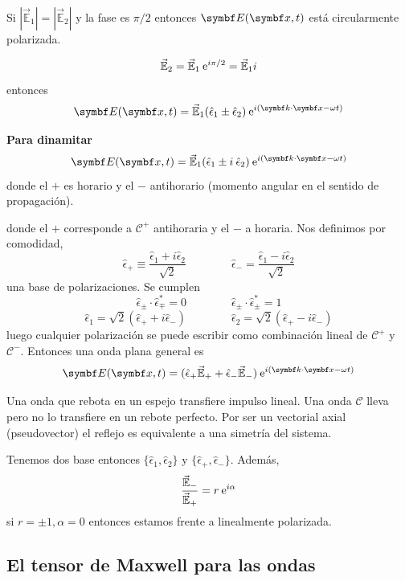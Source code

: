 \documentclass[10pt,oneside]{CBFT_book}
\begin{document}
Si $|\vec{\mathbb{E}}_1|=|\vec{\mathbb{E}}_2|$ y la fase es $\pi/2$ entonces $\vb{E}( \vb{x},t )$ está circularmente 
polarizada.

\[
	\vec{\mathbb{E}}_2 = \vec{\mathbb{E}}_1 \:\mathrm{e}^{i \pi/2} =\vec{\mathbb{E}}_1 i
\]
entonces
\[
	\vb{E}( \vb{x},t )= \vec{\mathbb{E}}_1 (\hat{\epsilon}_1  \pm \hat{\epsilon}_2 )
				\euler^{i( \pe{k}{x} -\omega t)}	
\]
\begin{ejemplo}{\bf Para dinamitar}
\[
 	\vb{E}( \vb{x},t )= \vec{\mathbb{E}}_1 (\hat{\epsilon}_1 \pm i \: \hat{\epsilon}_2 )
				\euler^{i( \pe{k}{x} -\omega t)}
\]
donde el $+$ es horario y el $-$ antihorario (momento angular en el sentido de propagación).
\end{ejemplo}
donde el $+$ corresponde a $\mathcal{C}^+$ antihoraria y el $-$ a horaria. Nos definimos por comodidad,
\[
	\hat{\epsilon}_+ \equiv \frac{\hat{\epsilon}_1 + i \hat{\epsilon}_2 }{\sqrt{2}} \qquad\qquad 
	\hat{\epsilon}_- = \frac{\hat{\epsilon}_1 - i \hat{\epsilon}_2 }{\sqrt{2}}
\]
una base de polarizaciones. Se cumplen
\[
	\hat{\epsilon}_\pm \cdot \hat{\epsilon}_\mp^* = 0 \qquad \qquad 
	\hat{\epsilon}_\pm \cdot \hat{\epsilon}_\pm^* = 1
\]
\[
	\hat{\epsilon}_1 = \sqrt{2}( \hat{\epsilon}_+ + i \hat{\epsilon}_- ) \qquad \qquad 
	\hat{\epsilon}_2 = \sqrt{2}( \hat{\epsilon}_+ - i \hat{\epsilon}_- )
\]
luego cualquier polarización se puede escribir como combinación lineal de $\mathcal{C}^+$ y $\mathcal{C}^-$.
Entonces una onda plana general es
\[
	\vb{E}( \vb{x},t )=(\hat{\epsilon}_+ \vec{\mathbb{E}}_+ + 
			\hat{\epsilon}_-\vec{\mathbb{E}}_-) \euler^{i( \pe{k}{x} -\omega t)}
\]

Una onda que rebota en un espejo transfiere impulso lineal. Una onda $\mathcal{C}$ lleva  pero no lo transfiere 
en un rebote perfecto. Por ser  un vectorial axial (pseudovector) el reflejo es equivalente a una simetría del 
sistema.

Tenemos dos base entonces $\{ \hat{\epsilon}_1 ,\hat{\epsilon}_2 \}$ y $\{ \hat{\epsilon}_+ ,\hat{\epsilon}_- \}$.
Además,
\[
	\frac{\vec{\mathbb{E}}_-}{\vec{\mathbb{E}}_+} = r\:\mathrm{e}^{i\alpha} 
\]
si $r = \pm 1, \alpha=0 $ entonces estamos frente a linealmente polarizada.

\subsection{El tensor de Maxwell para las ondas}
\end{document}

